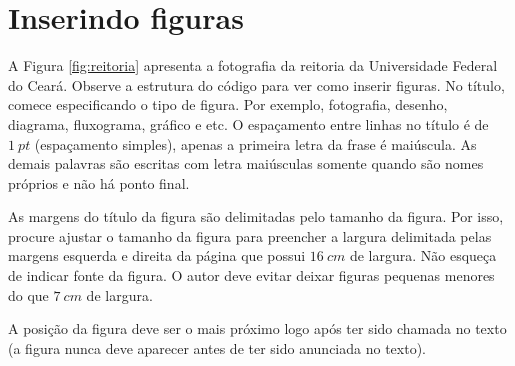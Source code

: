 
\section{Inserindo figuras}\label{sec:figuras}
    
    A Figura \ref{fig:reitoria} apresenta a fotografia da reitoria da Universidade Federal do Ceará. Observe a estrutura do código para ver como inserir figuras. No título, comece especificando o tipo de figura. Por exemplo, fotografia, desenho, diagrama, fluxograma, gráfico e etc. O espaçamento entre linhas no título é de $1~pt$ (espaçamento simples), apenas a primeira letra da frase é maiúscula. As demais palavras são escritas com letra maiúsculas somente quando são nomes próprios e não há ponto final. 
    
    As margens do título da figura são delimitadas pelo tamanho da figura. Por isso, procure ajustar o tamanho da figura para preencher a largura delimitada pelas margens esquerda e direita da página que possui $16~cm$ de largura. Não esqueça de indicar fonte da figura. O autor deve evitar deixar figuras pequenas menores do que $7~cm$ de largura.
    
    A posição da figura deve ser o mais próximo logo após ter sido chamada no texto (a figura nunca deve aparecer antes de ter sido anunciada no texto). 
    
 	\begin{figure}[h!] 
   	    \captionsetup{width=16cm}%
	\end{figure}
	
